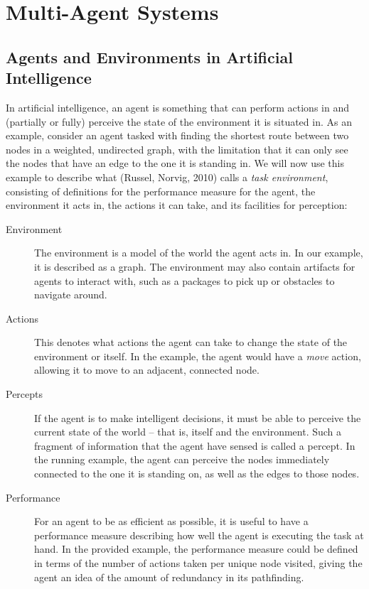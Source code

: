 
\section{Multi-Agent Systems}


\subsection{Agents and Environments in Artificial Intelligence}

In artificial intelligence, an agent is something that can perform
actions in and (partially or fully) perceive the state of the environment
it is situated in. As an example, consider an agent tasked with finding
the shortest route between two nodes in a weighted, undirected graph,
with the limitation that it can only see the nodes that have an edge
to the one it is standing in. We will now use this example to describe
what (Russel, Norvig, 2010) calls a \emph{task environment}, consisting
of definitions for the performance measure for the agent, the environment
it acts in, the actions it can take, and its facilities for perception:
\begin{description}
\item [{Environment}] The environment is a model of the world the agent
acts in. In our example, it is described as a graph. The environment
may also contain artifacts for agents to interact with, such as a
packages to pick up or obstacles to navigate around.
\item [{Actions}] This denotes what actions the agent can take to change
the state of the environment or itself. In the example, the agent
would have a \emph{move} action, allowing it to move to an adjacent,
connected node.
\item [{Percepts}] If the agent is to make intelligent decisions, it must
be able to perceive the current state of the world -- that is, itself
and the environment. Such a fragment of information that the agent
have sensed is called a percept. In the running example, the agent
can perceive the nodes immediately connected to the one it is standing
on, as well as the edges to those nodes.
\item [{Performance}] For an agent to be as efficient as possible, it is
useful to have a performance measure describing how well the agent
is executing the task at hand. In the provided example, the performance
measure could be defined in terms of the number of actions taken per
unique node visited, giving the agent an idea of the amount of redundancy
in its pathfinding.
\end{description}

